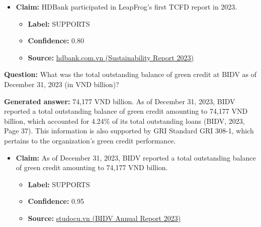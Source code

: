 \documentclass[sn-mathphys, oneside]{sn-jnl}
\begin{document}
{\begin{tcolorbox}[colback=white,colframe=black!65,boxrule=0.6pt,arc=0pt,left=8pt,right=8pt,top=8pt,bottom=8pt]
\begin{itemize}
    \item \textbf{Claim:} HDBank participated in LeapFrog's first TCFD report in 2023.
    \begin{itemize}
        \item \textbf{Label:} SUPPORTS
        \item \textbf{Confidence:} 0.80
        \item \textbf{Source:} \href{https://cdn.hdbank.com.vn/hdbank-file/investor/src/bctn-2023/phat-trien-ben-vung-EN.html}{hdbank.com.vn (Sustainability Report 2023)}
    \end{itemize}
\end{itemize}

\end{tcolorbox}


\begin{tcolorbox}[colback=white,colframe=black!65,boxrule=0.6pt,arc=0pt,left=8pt,right=8pt,top=8pt,bottom=8pt]

\textbf{Question:} What was the total outstanding balance of green credit at BIDV as of December 31, 2023 (in VND billion)?

\textbf{Generated answer:} 74,177 VND billion. As of December 31, 2023, BIDV reported a total outstanding balance of green credit amounting to 74,177 VND billion, which accounted for 4.24\% of its total outstanding loans (BIDV, 2023, Page 37). This information is also supported by GRI Standard GRI 308-1, which pertains to the organization's green credit performance.

\begin{itemize}
    \item \textbf{Claim:} As of December 31, 2023, BIDV reported a total outstanding balance of green credit amounting to 74,177 VND billion.
    \begin{itemize}
        \item \textbf{Label:} SUPPORTS
        \item \textbf{Confidence:} 0.95
        \item \textbf{Source:} \href{https://www.studocu.vn/vn/document/hoc-vien-tai-chinh/tai-chinh-tien-te/bidv-annual-report-2023-fn-da-nen-da-nen-1/108663677}{studocu.vn (BIDV Annual Report 2023)}
    \end{itemize}


\end{itemize}
\end{tcolorbox}}
\end{document}
